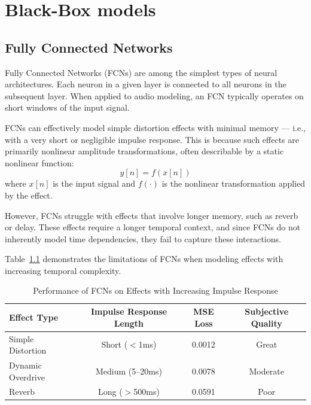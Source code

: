 \documentclass[masterthesis]{fer}
\begin{document}
\chapter{Black-Box models}
\label{sec:materialsandmethods}


\section{Fully Connected Networks}


Fully Connected Networks (FCNs) are among the simplest types of neural architectures. Each neuron in a given layer is connected to all neurons in the subsequent layer. When applied to audio modeling, an FCN typically operates on short windows of the input signal.

FCNs can effectively model simple distortion effects with minimal memory — i.e., with a very short or negligible impulse response. This is because such effects are primarily nonlinear amplitude transformations, often describable by a static nonlinear function:
\[
y[n] = f(x[n])
\]
where \( x[n] \) is the input signal and \( f(\cdot) \) is the nonlinear transformation applied by the effect.

However, FCNs struggle with effects that involve longer memory, such as reverb or delay. These effects require a longer temporal context, and since FCNs do not inherently model time dependencies, they fail to capture these interactions.

Table~\ref{tab:fcn_performance} demonstrates the limitations of FCNs when modeling effects with increasing temporal complexity.

\begin{table}[h]
\centering
\caption{Performance of FCNs on Effects with Increasing Impulse Response}
\label{tab:fcn_performance}
\begin{tabular}{lccc}
\toprule
\textbf{Effect Type} & \textbf{Impulse Response Length} & \textbf{MSE Loss} & \textbf{Subjective Quality} \\
\midrule
Simple Distortion   & Short ($<$1ms)     & 0.0012 & Great \\
Dynamic Overdrive   & Medium (5–20ms)    & 0.0078 & Moderate \\
Reverb              & Long ($>$500ms)    & 0.0591 & Poor \\
\bottomrule
\end{tabular}
\end{table}
\end{document}
